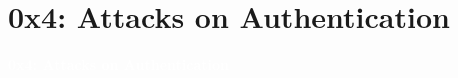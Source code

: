 \documentclass[aspectratio=169]{beamer}
\begin{document}
\section{0x4: Attacks on Authentication}
{
\begin{frame}
\huge{\textcolor{white}{\textbf{0x4: Attacks on Authentication}}}
\end{frame}
}
\end{document}

